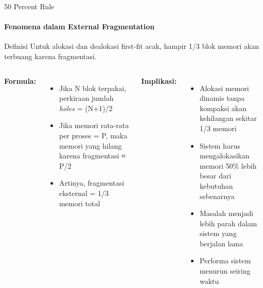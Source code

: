 \documentclass[10pt,aspectratio=169]{beamer}
\begin{document}
\begin{frame}{50 Percent Rule}
    \framesubtitle{Fenomena dalam External Fragmentation}
    
    \begin{block}{Definisi}
        Untuk alokasi dan dealokasi first-fit acak, hampir 1/3 blok memori akan terbuang karena fragmentasi.
    \end{block}
    
    \begin{columns}[T]
            \textbf{Formula:}
            \begin{itemize}
                \item Jika N blok terpakai, perkiraan jumlah \textit{holes} = (N+1)/2
                \item Jika memori rata-rata per proses = P, maka memori yang hilang karena fragmentasi ≈ P/2
                \item Artinya, fragmentasi eksternal = 1/3 memori total
            \end{itemize}
            
            \textbf{Implikasi:}
            \begin{itemize}
                \item Alokasi memori dinamis tanpa kompaksi akan kehilangan sekitar 1/3 memori
                \item Sistem harus mengalokasikan memori 50\% lebih besar dari kebutuhan sebenarnya
                \item Masalah menjadi lebih parah dalam sistem yang berjalan lama
                \item Performa sistem menurun seiring waktu
            \end{itemize}
    \end{columns}
\end{frame}
\end{document}
